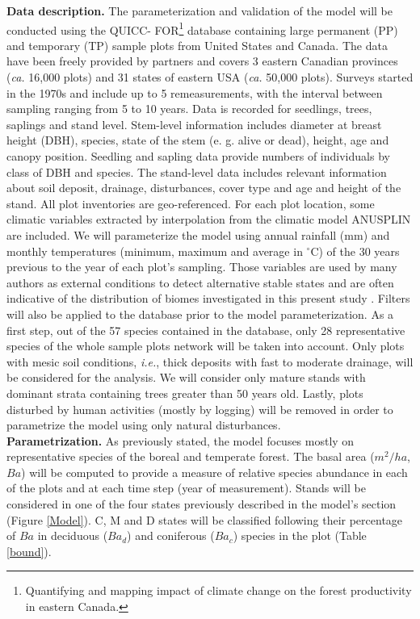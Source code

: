 \textbf{Data description.} The parameterization and validation of the model
will be conducted using the QUICC- FOR\footnote{Quantifying and mapping impact
of climate change on the forest productivity in eastern Canada.} database
containing large permanent (PP) and temporary (TP) sample plots from United
States and Canada. The data have been freely provided by partners and covers 3
eastern Canadian provinces (\textit{ca.} 16,000 plots) and 31 states of
eastern USA (\textit{ca.} 50,000 plots). Surveys started in the 1970s and
include up to 5 remeasurements, with the interval between sampling ranging
from 5 to 10 years. Data is recorded for seedlings, trees, saplings and stand
level. Stem-level information includes diameter at breast height (DBH),
species, state of the stem (e. g. alive or dead), height, age and canopy
position. Seedling and sapling data provide numbers of individuals by class of
DBH and species. The stand-level data includes relevant information about
soil deposit, drainage, disturbances, cover type and age and height of the
stand. All plot inventories are geo-referenced. For each plot location, some
climatic variables extracted by interpolation from the climatic
model ANUSPLIN \cite{McKenney2011} are included. We will parameterize the model using
annual rainfall (mm) and monthly temperatures (minimum, maximum and average in
\ensuremath{^\circ}C) of the 30 years previous to the year of each plot's sampling.
Those variables are used by many authors as external conditions to detect
alternative stable states and are often indicative of the distribution of
biomes investigated in this present study
\cite{Goldblum2010,Hirota2011,Scheffer2012}. Filters will also be applied to the
database prior to the model parameterization. As a first step, out of the 57
species contained in the database, only 28 representative species of the
whole sample plots network will be taken into account. Only plots with mesic
soil conditions, \textit{i.e.}, thick deposits with fast to moderate drainage,
will be considered for the analysis. We will consider only mature stands
with dominant strata containing trees greater than 50 years old. Lastly, plots
disturbed by human activities (mostly by logging) will be removed in order to
parametrize the model using only natural disturbances. \\


\textbf{Parametrization.} As previously stated, the model focuses mostly on
representative species of the boreal and temperate forest. The basal area
($m^2/ha$, $Ba$) will be computed to provide a measure of relative species
abundance in each of the plots and at each time step (year of measurement).
Stands will be considered in one of the four states previously described in
the model's section (Figure \ref{Model}). C, M and D states will be classified
following their percentage of $Ba$ in deciduous ($Ba_d$) and coniferous ($Ba_c$)
species in the plot (Table \ref{bound}). 

